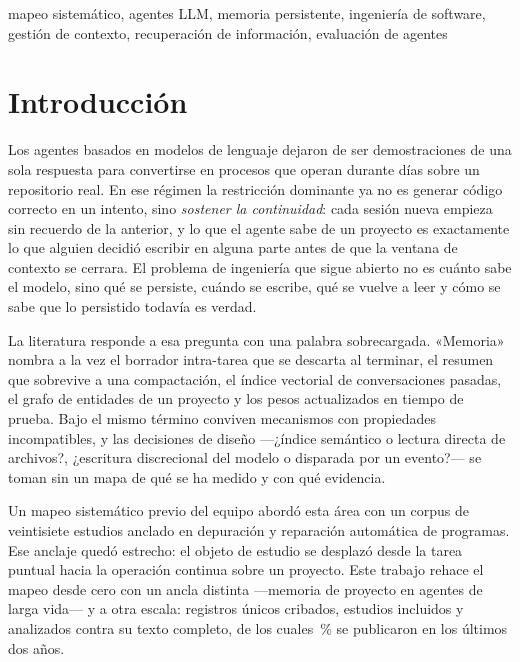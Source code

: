 \documentclass[conference]{IEEEtran}
\begin{document}
\begin{IEEEkeywords}
mapeo sistemático, agentes LLM, memoria persistente, ingeniería de software, gestión de contexto,
recuperación de información, evaluación de agentes
\end{IEEEkeywords}

\section{Introducción}
\label{sec:intro}

Los agentes basados en modelos de lenguaje dejaron de ser demostraciones de una sola respuesta para
convertirse en procesos que operan durante días sobre un repositorio real. En ese régimen la
restricción dominante ya no es generar código correcto en un intento, sino \emph{sostener la
continuidad}: cada sesión nueva empieza sin recuerdo de la anterior, y lo que el agente sabe de un
proyecto es exactamente lo que alguien decidió escribir en alguna parte antes de que la ventana de
contexto se cerrara. El problema de ingeniería que sigue abierto no es cuánto sabe el modelo, sino
qué se persiste, cuándo se escribe, qué se vuelve a leer y cómo se sabe que lo persistido todavía es
verdad.

La literatura responde a esa pregunta con una palabra sobrecargada. «Memoria» nombra a la vez el
borrador intra-tarea que se descarta al terminar, el resumen que sobrevive a una compactación, el
índice vectorial de conversaciones pasadas, el grafo de entidades de un proyecto y los pesos
actualizados en tiempo de prueba. Bajo el mismo término conviven mecanismos con propiedades
incompatibles, y las decisiones de diseño —¿índice semántico o lectura directa de archivos?,
¿escritura discrecional del modelo o disparada por un evento?— se toman sin un mapa de qué se ha
medido y con qué evidencia.

Un mapeo sistemático previo del equipo abordó esta área con un corpus de veintisiete estudios
anclado en depuración y reparación automática de programas. Ese anclaje quedó estrecho: el objeto de
estudio se desplazó desde la tarea puntual hacia la operación continua sobre un proyecto. Este
trabajo rehace el mapeo desde cero con un ancla distinta —memoria de proyecto en agentes de larga
vida— y a otra escala: \clSelUnicos{} registros únicos cribados, \clSelIncluidosTotal{} estudios
incluidos y \clCarAnalizados{} analizados contra su texto completo, de los cuales \clCarRecientesPct{}\,\%
se publicaron en los últimos dos años.
\end{document}
